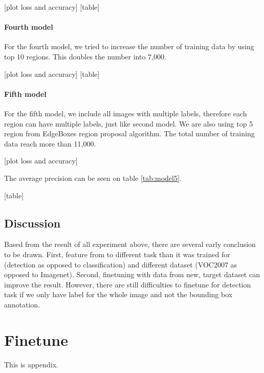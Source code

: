 \documentclass[a4paper,11pt]{kth-mag}
\begin{document}
[plot loss and accuracy]
[table]

\subsubsection{Fourth model}
For the fourth model, we tried to increase the number of training data by using top 10 regions. This doubles the number into 7,000.

[plot loss and accuracy]
[table]

\subsubsection{Fifth model}
For the fifth model, we include all images with multiple labels, therefore each region can have multiple labels, just like second model. We are also using top 5 region from EdgeBoxes region proposal algorithm. The total number of training data reach more than 11,000.

[plot loss and accuracy]

The average precision can be seen on table \ref{tab:model5}.

[table]

\section{Discussion}
Based from the result of all experiment above, there are several early conclusion to be drawn. First, feature from to different task than it was trained for (detection as opposed to classification) and different dataset (VOC2007 as opposed to Imagenet). Second, finetuning with data from new, target dataset can improve the result. However, there are still difficulties to finetune for detection task if we only have label for the whole image and not the bounding box annotation.




\appendix
\addappheadtotoc
\chapter{Finetune}\label{appA}

This is appendix.
\end{document}
